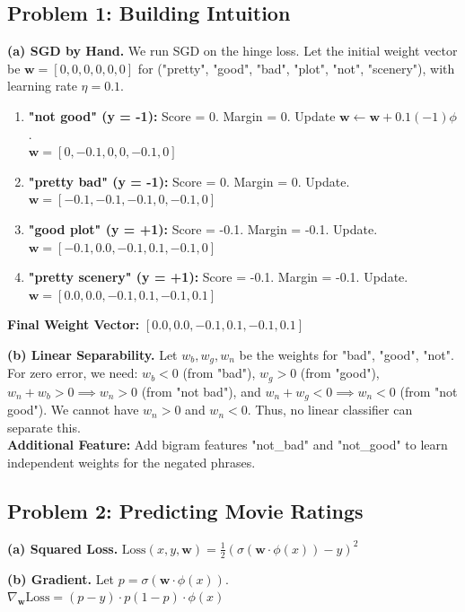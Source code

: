 \documentclass[11pt,a4paper]{article}
\begin{document}
\subsection{Problem 1: Building Intuition}
\textbf{(a) SGD by Hand.} We run SGD on the hinge loss. Let the initial weight vector be \(\mathbf{w} = [0, 0, 0, 0, 0, 0]\) for ("pretty", "good", "bad", "plot", "not", "scenery"), with learning rate \(\eta = 0.1\).
\begin{enumerate}
    \item \textbf{"not good" (y = -1):} Score = 0. Margin = 0. Update \(\mathbf{w} \leftarrow \mathbf{w} + 0.1(-1)\phi\). \\
    \(\mathbf{w} = [0, -0.1, 0, 0, -0.1, 0]\)
    \item \textbf{"pretty bad" (y = -1):} Score = 0. Margin = 0. Update. \\
    \(\mathbf{w} = [-0.1, -0.1, -0.1, 0, -0.1, 0]\)
    \item \textbf{"good plot" (y = +1):} Score = -0.1. Margin = -0.1. Update. \\
    \(\mathbf{w} = [-0.1, 0.0, -0.1, 0.1, -0.1, 0]\)
    \item \textbf{"pretty scenery" (y = +1):} Score = -0.1. Margin = -0.1. Update. \\
    \(\mathbf{w} = [0.0, 0.0, -0.1, 0.1, -0.1, 0.1]\)
\end{enumerate}
\textbf{Final Weight Vector:} \([0.0, 0.0, -0.1, 0.1, -0.1, 0.1]\)

\medskip
\noindent\textbf{(b) Linear Separability.} Let \(w_b, w_g, w_n\) be the weights for "bad", "good", "not". For zero error, we need: \(w_b < 0\) (from "bad"), \(w_g > 0\) (from "good"), \(w_n + w_b > 0 \implies w_n > 0\) (from "not bad"), and \(w_n + w_g < 0 \implies w_n < 0\) (from "not good"). We cannot have \(w_n > 0\) and \(w_n < 0\). Thus, no linear classifier can separate this. \\
\textbf{Additional Feature:} Add bigram features "not\_bad" and "not\_good" to learn independent weights for the negated phrases.

\subsection{Problem 2: Predicting Movie Ratings}
\textbf{(a) Squared Loss.} \(\text{Loss}(x, y, \mathbf{w}) = \frac{1}{2} (\sigma(\mathbf{w} \cdot \phi(x)) - y)^2\)

\medskip
\noindent\textbf{(b) Gradient.} Let \(p = \sigma(\mathbf{w} \cdot \phi(x))\). \\
\(\nabla_\mathbf{w} \text{Loss} = (p - y) \cdot p(1 - p) \cdot \phi(x)\)
\end{document}

